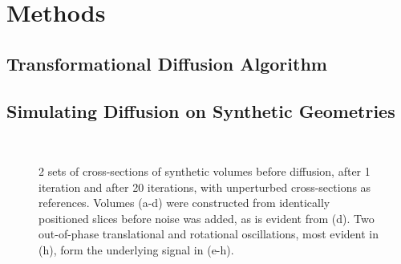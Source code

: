 \section{Methods} %
\label{sec:methods}
  \subsection{Transformational Diffusion Algorithm} %
  \label{sub:transformational_diffusion_algorithm}
    
    
  \subsection{Simulating Diffusion on Synthetic Geometries} %
  \label{sub:simulating_diffusion_on_synthetic_geometries}
  
    \begin{figure}[htbp]
      \centering
      \\
      \caption{2 sets of cross-sections of synthetic volumes before diffusion, after 1 iteration and after 20 iterations, with unperturbed cross-sections as references. Volumes (a-d) were constructed from identically positioned slices before noise was added, as is evident from (d). Two out-of-phase translational and rotational oscillations, most evident in (h), form the underlying signal in (e-h).}
      \label{fig:synthetic_cross_sections}
    \end{figure}
    
